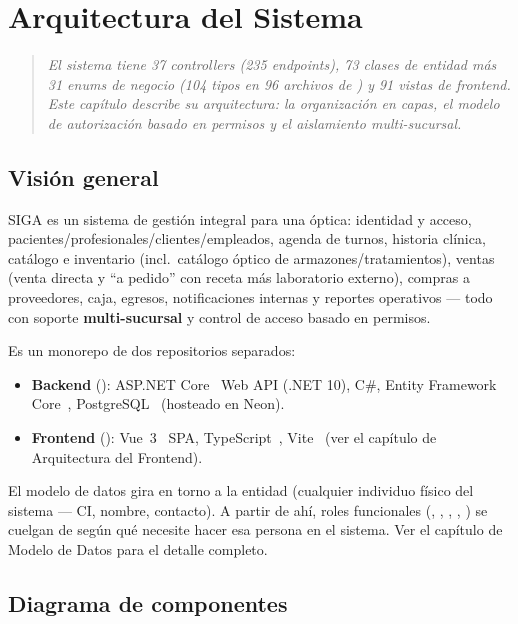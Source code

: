 \chapter{Arquitectura del Sistema}
\label{sec:arch}

\begin{quote}
\itshape
El sistema tiene 37 controllers (235 endpoints), 73 clases de entidad más 31 enums de negocio (104 tipos en 96 archivos de \allowbreak {}\allowbreak {}) y 91 vistas de frontend. Este capítulo describe su arquitectura: la organización en capas, el modelo de autorización basado en permisos y el aislamiento multi-sucursal.
\end{quote}

\section{Visión general}
\label{sec:arch-vision-general}

SIGA es un sistema de gestión integral para una óptica: identidad y acceso, pacientes/profesionales/clientes/empleados, agenda de turnos, historia clínica, catálogo e inventario (incl.\ catálogo óptico de armazones/tratamientos), ventas (venta directa y ``a pedido'' con receta más laboratorio externo), compras a proveedores, caja, egresos, notificaciones internas y reportes operativos --- todo con soporte \textbf{multi-sucursal} y control de acceso basado en permisos.

Es un monorepo de dos repositorios separados:
\begin{itemize}
  \item \textbf{Backend} (): ASP.NET Core~\cite{msaspnetcore} Web API (.NET 10), C\#, Entity Framework Core~\cite{msefcore}, PostgreSQL~\cite{postgresql} (hosteado en Neon).
  \item \textbf{Frontend} (): Vue~3~\cite{vuejs} SPA, TypeScript~\cite{typescript}, Vite~\cite{vite} (ver el capítulo de Arquitectura del Frontend).
\end{itemize}

El modelo de datos gira en torno a la entidad  (cualquier individuo físico del sistema --- CI, nombre, contacto). A partir de ahí, roles funcionales (, , , , ) se cuelgan de  según qué necesite hacer esa persona en el sistema. Ver el capítulo de Modelo de Datos para el detalle completo.

\section{Diagrama de componentes}
\label{sec:arch-diagrama-componentes}

